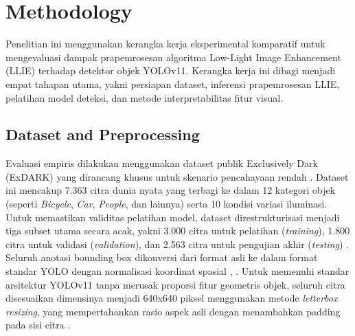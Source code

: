 ﻿\documentclass[conference]{IEEEtran}
\begin{document}

\section{Methodology}
Penelitian ini menggunakan kerangka kerja eksperimental komparatif untuk mengevaluasi dampak prapemrosesan algoritma Low-Light Image Enhancement (LLIE) terhadap detektor objek YOLOv11. Kerangka kerja ini dibagi menjadi empat tahapan utama, yakni persiapan dataset, inferensi prapemrosesan LLIE, pelatihan model deteksi, dan metode interpretabilitas fitur visual.

\subsection{Dataset and Preprocessing} Evaluasi empiris dilakukan menggunakan dataset publik Exclusively Dark (ExDARK) yang dirancang khusus untuk skenario pencahayaan rendah \cite{loh2019exdark}. Dataset ini mencakup 7.363 citra dunia nyata yang terbagi ke dalam 12 kategori objek (seperti \textit{Bicycle}, \textit{Car}, \textit{People}, dan lainnya) serta 10 kondisi variasi iluminasi. Untuk memastikan validitas pelatihan model, dataset direstrukturisasi menjadi tiga subset utama secara acak, yakni 3.000 citra untuk pelatihan (\textit{training}), 1.800 citra untuk validasi (\textit{validation}), dan 2.563 citra untuk pengujian akhir (\textit{testing}) \cite{proposal2026sempro}.
Seluruh anotasi bounding box dikonversi dari format asli ke dalam format standar YOLO dengan normalisasi koordinat spasial \cite{padilla2021metrics}, \cite{proposal2026sempro}. Untuk memenuhi standar arsitektur YOLOv11 tanpa merusak proporsi fitur geometris objek, seluruh citra disesuaikan dimensinya menjadi 640x640 piksel menggunakan metode \textit{letterbox resizing}, yang mempertahankan rasio aspek asli dengan menambahkan padding pada sisi citra \cite{proposal2026sempro}.
\end{document}
